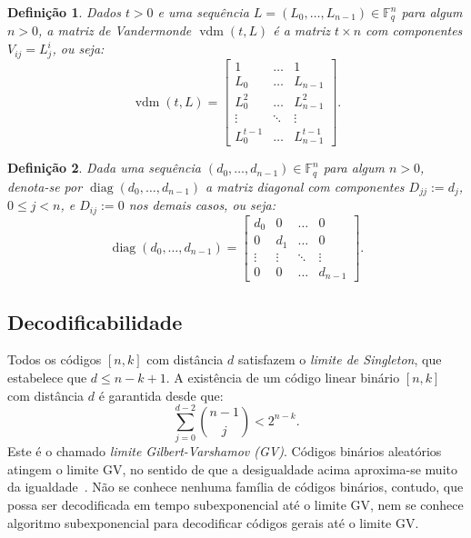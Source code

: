 \documentclass{SBCbookchapter}
\newcommand{\F}{\mathbb{F}}
\DeclareMathOperator{\vdm}{vdm}
\DeclareMathOperator{\diag}{diag}
\newtheorem{definition}{Definição}{\bfseries}{\itshape}
\begin{document}
\begin{otherlanguage}{brazilian}
\begin{definition}
Dados $t > 0$ e uma sequência $L = (L_0, \dots, L_{n-1}) \in \F_q^n$ para algum $n > 0$, a \emph{matriz de Vandermonde} $\vdm(t, L)$ é a matriz $t \times n$ com componentes $V_{ij} = L_j^i$, ou seja:
\[
\vdm(t, L) = \left[
\begin{array}{ccc}
1         & \dots  & 1\\
L_0       & \dots  & L_{n-1}\\
L_0^2     & \dots  & L_{n-1}^2\\
\vdots    & \ddots & \vdots\\
L_0^{t-1} & \dots  & L_{n-1}^{t-1}
\end{array}
\right].
\]
\end{definition}

\begin{definition}
Dada uma sequência $(d_0, \dots, d_{n-1}) \in \F_q^n$ para algum $n > 0$, denota-se por $\diag(d_0, \dots, d_{n-1})$ a \emph{matriz diagonal} com componentes $D_{jj} := d_j$, $0 \leqslant j < n$, e $D_{ij} := 0$ nos demais casos, ou seja:
\[
\diag(d_0, \dots, d_{n-1}) = \left[
\begin{array}{cccc}
d_0    & 0      & \dots  & 0\\
0      & d_1    & \dots  & 0\\
\vdots & \vdots & \ddots & \vdots\\
0      & 0      & \dots  & d_{n-1}
\end{array}
\right].
\]
\end{definition}

\subsection{Decodificabilidade}\label{subsec:decodability}

Todos os códigos $[n, k]$ com distância $d$ satisfazem o \emph{limite de Singleton}, que estabelece que $d \leqslant n - k + 1$. A existência de um código linear binário $[n, k]$ com distância $d$ é garantida desde que:
\[
\sum_{j = 0}^{d-2}{\binom{n-1}{j}} < 2^{n - k}.
\]
Este é o chamado \emph{limite Gilbert-Varshamov (GV)}. Códigos binários aleatórios atingem o limite GV, no sentido de que a desigualdade acima aproxima-se muito da igualdade~\cite{macwilliams-sloane}. Não se conhece nenhuma família de códigos binários, contudo, que possa ser decodificada em tempo subexponencial até o limite GV, nem se conhece algoritmo subexponencial para decodificar códigos gerais até o limite GV.


\end{otherlanguage}
\end{document}
